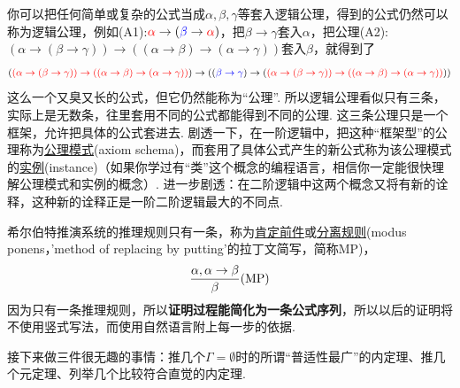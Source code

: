 \documentclass[main.tex]{subfiles}
\begin{document}
你可以把任何简单或复杂的公式当成\(\alpha,\beta,\gamma\)等套入逻辑公理，得到的公式仍然可以称为逻辑公理，例如(A1):\({\color{red}\alpha} \to ({\color{blue}\beta} \to {\color{red}\alpha})\)，把\(\beta \to \gamma\)套入\(\alpha\)，把公理(A2):\((\alpha \to (\beta \to \gamma)) \to ((\alpha \to \beta) \to (\alpha \to \gamma))\)套入\(\beta\)，就得到了
\[({\color{red} (\alpha \to (\beta \to \gamma)) \to ((\alpha \to \beta) \to (\alpha \to \gamma))}) \to (({\color{blue}\beta \to \gamma}) \to ({\color{red}(\alpha \to (\beta \to \gamma)) \to ((\alpha \to \beta) \to (\alpha \to \gamma))}))\]
这么一个又臭又长的公式，但它仍然能称为“公理”. 所以逻辑公理看似只有三条，实际上是无数条，往里套用不同的公式都能得到不同的公理. 这三条公理只是一个框架，允许把具体的公式套进去. 剧透一下，在一阶逻辑中，把这种“框架型”的公理称为\uline{公理模式}(axiom schema)，而套用了具体公式产生的新公式称为该公理模式的\uline{实例}(instance)（如果你学过有“类”这个概念的编程语言，相信你一定能很快理解公理模式和实例的概念）. 进一步剧透：在二阶逻辑中这两个概念又将有新的诠释，这种新的诠释正是一阶二阶逻辑最大的不同点. 

希尔伯特推演系统的推理规则只有一条，称为\uline{肯定前件}或\uline{分离规则}(modus ponens，'method of replacing by putting'的拉丁文简写，简称MP)，
\[{\alpha, \alpha \to \beta \over \beta}({\rm MP})\]
因为只有一条推理规则，所以\textbf{证明过程能简化为一条公式序列}，所以以后的证明将不使用竖式写法，而使用自然语言附上每一步的依据.

接下来做三件很无趣的事情：推几个\(\Gamma=\emptyset\)时的所谓“普适性最广”的内定理、推几个元定理、列举几个比较符合直觉的内定理.

\end{document}
